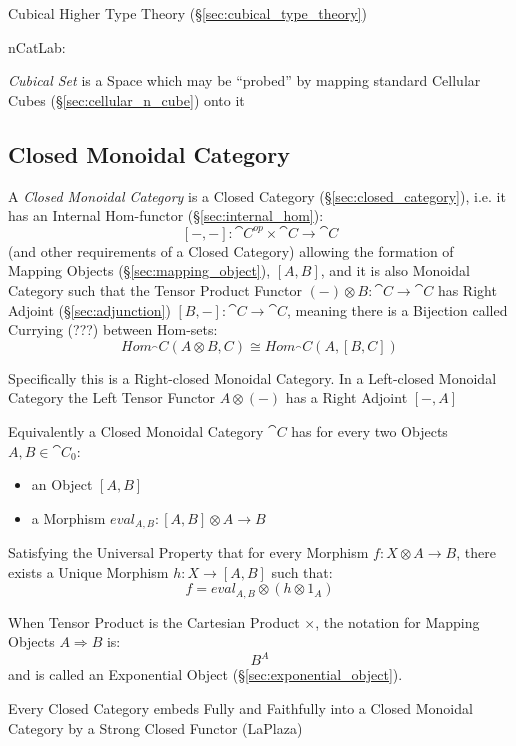Cubical Higher Type Theory (\S\ref{sec:cubical_type_theory})

nCatLab:

\emph{Cubical Set} is a Space which may be ``probed'' by mapping
standard Cellular Cubes (\S\ref{sec:cellular_n_cube}) onto it



\subsection{Closed Monoidal Category}\label{sec:closed_monoidal}

A \emph{Closed Monoidal Category} is a Closed Category
(\S\ref{sec:closed_category}), i.e. it has an Internal Hom-functor
(\S\ref{sec:internal_hom}):
\[
  [-,-] : \cat{C}^{op} \times \cat{C} \rightarrow \cat{C}
\]
(and other requirements of a Closed Category) allowing the formation
of Mapping Objects (\S\ref{sec:mapping_object}), $[A,B]$,
and it is also Monoidal Category such that the Tensor Product Functor
$(-) \otimes B : \cat{C} \rightarrow \cat{C}$ has Right Adjoint
(\S\ref{sec:adjunction}) $[B,-] : \cat{C} \rightarrow \cat{C}$,
meaning there is a Bijection called Currying (???) between Hom-sets:
\[
  Hom_\cat{C}(A \otimes B,C) \cong Hom_\cat{C}(A, [B,C])
\]

Specifically this is a Right-closed Monoidal Category. In a
Left-closed Monoidal Category the Left Tensor Functor $A \otimes (-)$
has a Right Adjoint $[-,A]$

Equivalently a Closed Monoidal Category $\cat{C}$ has for every two
Objects $A,B \in \cat{C}_0$:
\begin{itemize}
  \item an Object $[A,B]$
  \item a Morphism $eval_{A,B} : [A,B] \otimes A \rightarrow B$
\end{itemize}
Satisfying the Universal Property that for every Morphism $f : X
\otimes A \rightarrow B$, there exists a Unique Morphism $h : X
\rightarrow [A,B]$ such that:
\[
  f = eval_{A,B} \otimes (h \otimes 1_A)
\]

When Tensor Product is the Cartesian Product $\times$, the notation
for Mapping Objects $A \Rightarrow B$ is:
\[
  B^A
\]
and is called an Exponential Object (\S\ref{sec:exponential_object}).

Every Closed Category embeds Fully and Faithfully into a Closed
Monoidal Category by a Strong Closed Functor (LaPlaza)

